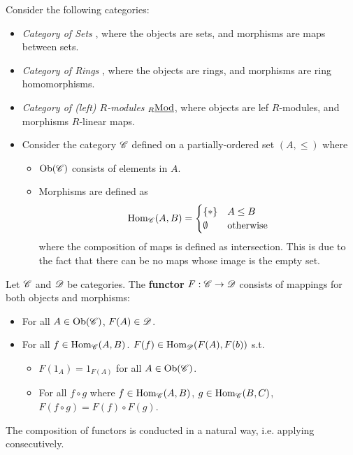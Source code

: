 \documentclass{article}
\begin{document}
\begin{example}
    Consider the following categories:
    \begin{itemize}
        \item \emph{Category of Sets} \catsets, where the objects are sets, and morphisms are maps between sets.
        \item \emph{Category of Rings} \catrings, where the objects are rings, and morphisms are ring homomorphisms.
        \item \emph{Category of (left) $R$-modules} ${}_{R}\underline{\textup{Mod}}$, where objects are lef $R$-modules, and morphisms $R$-linear maps.
        \item Consider the category $\mathscr{C}$ defined on a partially-ordered set $(A, \leq)$ where 
        \begin{itemize}
            \item $\mathrm{Ob}(\mathscr{C})$ consists of elements in $A$. 
            \item Morphisms are defined as
            \[
                \mathrm{Hom}_{\mathscr{C}}(A, B) = \begin{cases}
                    \{\ast\} & A \leq B \\
                    \emptyset & \text{otherwise}
                \end{cases}
            \]
            where the composition of maps is defined as intersection. This is due to the fact that there can be no maps whose image is the empty set.
        \end{itemize}
    \end{itemize}
\end{example}

\begin{definition}[Functor]
    Let $\mathscr{C}$ and $\mathscr{D}$ be categories. The \textbf{functor} $F: \mathscr{C} \to \mathscr{D}$ consists of mappings for both objects and morphisms:
    \begin{itemize}
        \item For all $A \in \mathrm{Ob}(\mathscr{C})$, $F(A) \in \mathscr{D}$.
        \item For all $f\in \mathrm{Hom}_{\mathscr{C}}(A, B)$. $F(f) \in \mathrm{Hom}_{\mathscr{D}} (F(A), F(b))$ s.t. 
        \begin{itemize}
            \item $F(1_A) = 1_{F(A)}$ for all $A \in \mathrm{Ob}(\mathscr{C})$. 
            \item For all $f \circ g$ where $f \in \mathrm{Hom}_{\mathscr{C}}(A, B)$, $g \in \mathrm{Hom}_{\mathscr{C}}(B, C)$, $F(f \circ g) = F(f) \circ F(g)$.
        \end{itemize}
    \end{itemize}
    The composition of functors is conducted in a natural way, i.e. applying consecutively. 
\end{definition}
\end{document}
